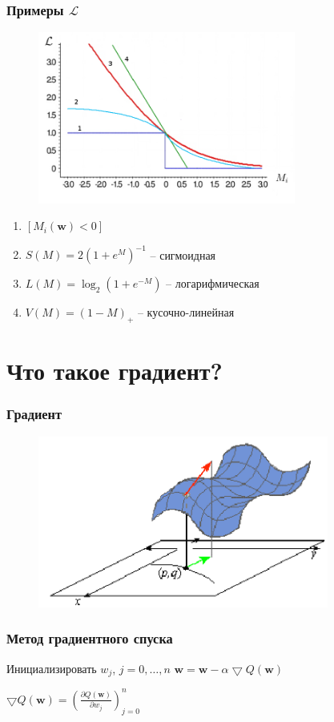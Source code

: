 \documentclass[10pt]{beamer}
\begin{document}
\begin{frame}\frametitle{Примеры $\mathcal{L}$}
	\begin{figure}[htbp]
	  \includegraphics[height=160pt, keepaspectratio = true]{images/l}
	\end{figure}

	\begin{enumerate}
		\item $\left[M_i(\mathbf{w}) < 0 \right]$
		\item $S(M) = 2(1+e^M)^{-1}$ -- сигмоидная
		\item $L(M) = \log_2(1+e^{-M})$ -- логарифмическая
		\item $V(M) = (1-M)_+$ -- кусочно-линейная
	\end{enumerate}
\end{frame}

\section{Что такое градиент?}

\begin{frame}\frametitle{Градиент}
	\begin{figure}[htbp]
	  \includegraphics[height=160pt, keepaspectratio = true]{images/gradient}
	\end{figure}
\end{frame}

{
\begin{frame}\frametitle{Метод градиентного спуска}
  \begin{algorithmic}[1]
     \State Инициализировать $w_j$, $j=0,\dots, n$
       \State $\mathbf{w} =  \mathbf{w} - \alpha \bigtriangledown Q(\mathbf{w})$
     \EndRepeat
    \EndFunction
  \end{algorithmic}

	$\bigtriangledown Q(\mathbf{w}) = (\frac{\partial Q(\mathbf{w})}{\partial w_j})_{j=0}^n$\\
\end{frame}
}
\end{document}
